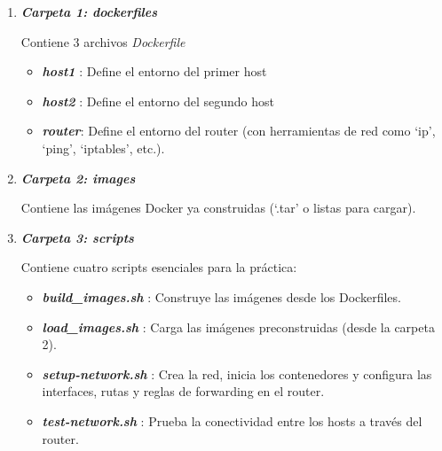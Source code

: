 \documentclass[12pt]{amsart}
\begin{document}
	\begin{enumerate}
		
		\thispagestyle{empty}
		
		\item \textbf{\textit{Carpeta 1: dockerfiles}}
		
		\medskip
		\noindent Contiene 3 archivos \textit{Dockerfile}
			
		\medskip
			\begin{itemize}
				\item \textbf{\textit{host1}} : Define el entorno del primer host
				\smallskip
				\item \textbf{\textit{host2}} : Define el entorno del segundo host
				\smallskip
				\item \textbf{\textit{router}}: Define el entorno del router (con herramientas de red como `ip', `ping', `iptables', etc.).
			\end{itemize}
		
		\bigskip\bigskip
		
		\item \textbf{\textit{Carpeta 2: images}}
		
		\medskip
		\noindent Contiene las imágenes Docker ya construidas (`.tar' o listas para cargar).
		
		\bigskip\bigskip
		
		\item \textbf{\textit{Carpeta 3: scripts}}
		
		\medskip
		\noindent Contiene cuatro scripts esenciales para la práctica: 

		\medskip
			\begin{itemize}
				\item \textbf{\textit{build\_images.sh}} : Construye las imágenes desde los Dockerfiles. 
				\smallskip
				\item \textbf{\textit{load\_images.sh}} : Carga las imágenes preconstruidas (desde la carpeta 2). 
				\smallskip
				\item \textbf{\textit{setup-network.sh}} : Crea la red, inicia los contenedores y configura las interfaces, rutas y reglas de forwarding en el router. 
				\smallskip
				\item \textbf{\textit{test-network.sh}} : Prueba la conectividad entre los hosts a través del router. 
				\smallskip
			\end{itemize}
		

\end{enumerate}
\end{document}
